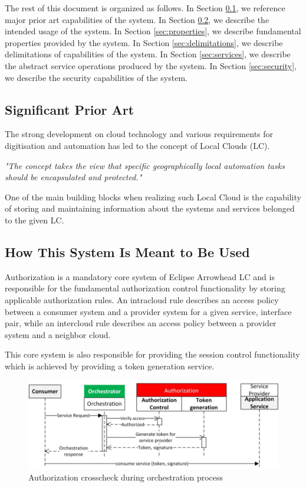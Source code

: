 \documentclass[a4paper]{arrowhead}
\begin{document}
The rest of this document is organized as follows.
In Section \ref{sec:prior_art}, we reference major prior art capabilities
of the system.
In Section \ref{sec:use}, we describe the intended usage of the system.
In Section \ref{sec:properties}, we describe fundamental properties
provided by the system.
In Section \ref{sec:delimitations}, we describe delimitations of capabilities
of the system.
In Section \ref{sec:services}, we describe the abstract service
operations produced by the system.
In Section \ref{sec:security}, we describe the security capabilities
of the system.

\newpage

\subsection{Significant Prior Art}
\label{sec:prior_art}

The strong development on cloud technology and various requirements for digitisation and automation has led to the concept of Local Clouds (LC).

\textit{"The concept takes the view that specific geographically local automation tasks should be encapsulated and protected."} \cite{jerker2017localclouds}

One of the main building blocks when realizing such Local Cloud is the capability of storing and maintaining information about the systems and services belonged to the given LC.

\subsection{How This System Is Meant to Be Used}
\label{sec:use}

Authorization is a mandatory core system of Eclipse Arrowhead LC and is responsible for the fundamental authorization control functionality by storing applicable authorization rules. An intracloud rule describes an access policy between a consumer system and a provider system for a given service, interface pair, while an intercloud rule describes an access policy between a provider system and a neighbor cloud.

This core system is also responsible for providing the session control functionality which is achieved by providing a token generation service. 

\begin{figure}[h!]
  \centering
  \includegraphics[width=15cm]{figures/authorization_control.png}
  \caption{
   Authorization crosscheck during orchestration process
  }
  \label{fig:information_overview}
\end{figure}
\end{document}
